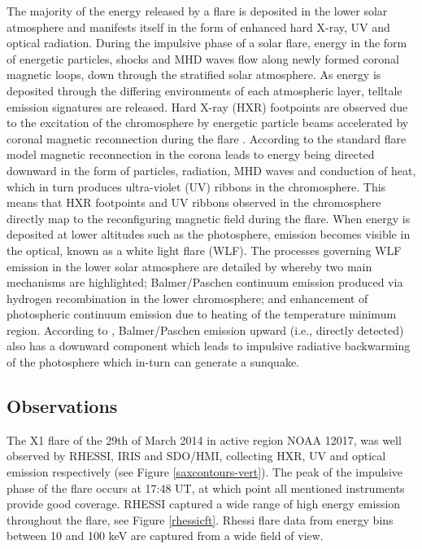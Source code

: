 The majority of the energy released by a flare is deposited in the lower solar atmosphere and manifests itself in the form of enhanced hard X-ray, UV and optical radiation. During the impulsive phase of a solar flare, energy in the form of energetic particles, shocks and MHD waves flow along newly formed coronal magnetic loops, down through the stratified solar atmosphere. As energy is deposited through the differing environments of each atmospheric layer, telltale emission signatures are released. Hard X-ray (HXR) footpoints are observed due to the excitation of the chromosphere by energetic particle beams accelerated by coronal magnetic reconnection during the flare \citep{1995ApJ...455..347A}. According to the standard flare model \citep{1964NASSP..50..451C, 1966Natur.211..695S, 1974SoPh...34..323H, 1976SoPh...50...85K} magnetic reconnection in the corona leads to energy being directed downward in the form of particles, radiation, MHD waves and conduction of heat, which in turn produces ultra-violet (UV) ribbons in the chromosphere. This means that HXR footpoints and UV ribbons observed in the chromosphere directly map to the reconfiguring magnetic field during the flare. When energy is deposited at lower altitudes such as the photosphere, emission becomes visible in the optical, known as a white light flare (WLF). The processes governing WLF emission in the lower solar atmosphere are detailed by \cite{2007ASPC..368..417D} whereby two main mechanisms are highlighted; Balmer/Paschen continuum emission produced via hydrogen recombination in the lower chromosphere; and enhancement of photospheric continuum emission due to heating of the temperature minimum region. According to \cite{1989SoPh..124..303M}, Balmer/Paschen emission upward (i.e., directly detected) also has a downward component which leads to impulsive radiative backwarming of the photosphere which in-turn can generate a sunquake.




\subsection{Observations}
The X1 flare of the 29th of March 2014 in active region NOAA 12017, was well observed by RHESSI, IRIS and SDO/HMI, collecting HXR, UV and optical emission respectively (see Figure \ref{saxcontours-vert}). The peak of the impulsive phase of the flare occurs at 17:48 UT, at which point all mentioned instruments provide good coverage. RHESSI captured a wide range of high energy emission throughout the flare, see Figure \ref{rhessicft}. Rhessi flare data from energy bins between 10 and 100 keV are captured from a wide field of view.%

